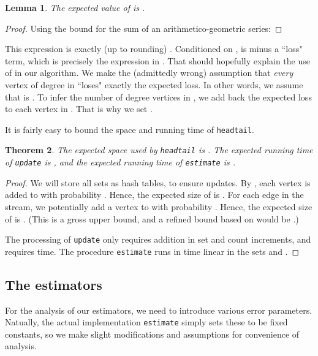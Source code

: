 \documentclass[11pt]{article}
\newtheorem{theorem}{Theorem}
\newtheorem{lemma}[theorem]{Lemma}
\theoremstyle{definition}
\newcommand{\degdist}{{\tt headtail}}
\newcommand{\update}{{\tt update}}
\newcommand{\est}{{\tt estimate}}
\begin{document}
\begin{lemma} \label{lem:geo} The expected value of  is .
\end{lemma}

\begin{proof} Using the bound for the sum of an arithmetico-geometric series:

\end{proof}

This expression is exactly (up to rounding) .
Conditioned on ,  is  minus a ``loss" term, which is precisely
the expression in . That should hopefully explain the use of  in our algorithm.
We make the (admittedly wrong) assumption that \emph{every} vertex of degree  in 
``loses" exactly the expected loss. In other words, we assume that  is .
To infer the number of degree  vertices in , we add back the expected loss
to each vertex in . That is why we set .

\medskip

It is fairly easy to bound the space and running time of \degdist.

\begin{theorem} \label{thm:time} The expected space used by \degdist{} is .
The expected running time of \update{} is , and the expected running time of \est{} is .
\end{theorem}

\begin{proof} We will store all sets as hash tables, to ensure  updates.
By , each vertex is added to  with probability . Hence, the expected size
of  is . For each edge in the stream, we potentially add a vertex
to  with probability . Hence, the expected size of  is . (This is a gross
upper bound, and a refined bound based on  would be .)

The processing of \update{} only requires addition in set and count increments,
and requires  time. The procedure \est{} runs in time linear in the sets  and .
\end{proof}


\subsection{The estimators} \label{sec:est}

For the analysis of our estimators, we need to introduce various error parameters. Natually,
the actual implementation \est{} simply sets these to be fixed constants, so we make
slight modifications and assumptions for convenience of analysis.
\end{document}
